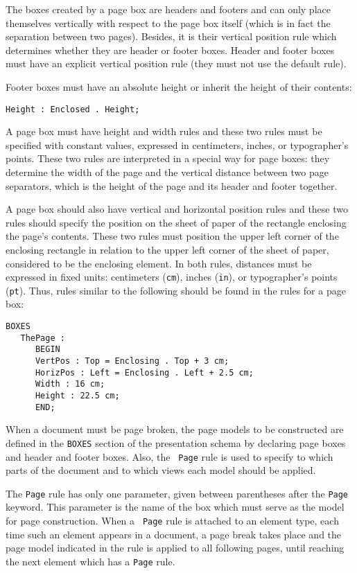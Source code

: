 The boxes created by a page box are headers and footers and can only
place themselves vertically with respect to the page box itself (which
is in fact the separation between two pages).  Besides, it is their
vertical position rule  which determines whether they are header or
footer boxes.  Header and footer boxes must have an explicit vertical
position rule (they must not use the default rule).

Footer boxes must have an absolute height or inherit the height of
their contents:
\begin{verbatim}
Height : Enclosed . Height;
\end{verbatim}

A page box must have height and width rules and these two rules must
be specified with constant values, expressed in centimeters, inches,
or typographer's points.  These two rules are interpreted in a special
way for page boxes:  they determine the width of the page and the
vertical distance between two page separators, which is the height of
the page and its header and footer together.

A page box should also have vertical and horizontal position rules and
these two rules should specify the position on the sheet of paper of
the rectangle enclosing the page's contents.  These two rules must
position the upper left corner of the enclosing rectangle in relation
to the upper left corner of the sheet of paper, considered to be the
enclosing element.  In both rules, distances must be expressed in
fixed units: centimeters ({\tt cm}), inches ({\tt in}), or
typographer's points ({\tt pt}).  Thus, rules similar to the following
should be found in the rules for a page box:

\begin{verbatim}
BOXES
   ThePage :
      BEGIN
      VertPos : Top = Enclosing . Top + 3 cm;
      HorizPos : Left = Enclosing . Left + 2.5 cm;
      Width : 16 cm;
      Height : 22.5 cm;
      END;
\end{verbatim}

When a document must be page broken, the page models to be constructed
are defined in the {\tt BOXES} section of the presentation schema by
declaring page boxes and header and footer boxes.  Also, the {\tt
Page} rule is used to specify to which parts of the document and to
which views each model should be applied.

The {\tt Page} rule has only one parameter, given between parentheses
after the {\tt Page} keyword.  This parameter is the name of the box
which must serve as the model for page construction.  When a {\tt
Page} rule is attached to an element type, each time such an element
appears in a document, a page break takes place and the page model
indicated in the rule is applied to all following pages, until
reaching the next element which has a {\tt Page} rule.


